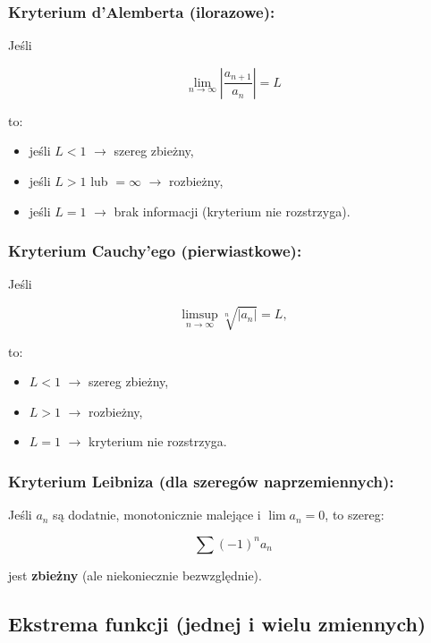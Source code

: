 \subsubsection*{Kryterium d'Alemberta (ilorazowe):}
Jeśli

$$
\lim_{n \to \infty} \left| \frac{a_{n+1}}{a_n} \right| = L
$$

to:
\begin{itemize}
    \item jeśli $L < 1$ $\rightarrow$ szereg zbieżny,
    \item jeśli $L > 1$ lub $= \infty$ $\rightarrow$ rozbieżny,
    \item jeśli $L = 1$ $\rightarrow$ brak informacji (kryterium nie rozstrzyga).
\end{itemize}

\subsubsection*{Kryterium Cauchy'ego (pierwiastkowe):}
Jeśli

$$
\limsup_{n \to \infty} \sqrt[n]{|a_n|} = L,
$$

to:
\begin{itemize}
    \item $L < 1$ $\rightarrow$ szereg zbieżny,
    \item $L > 1$ $\rightarrow$ rozbieżny,
    \item $L = 1$ $\rightarrow$ kryterium nie rozstrzyga.
\end{itemize}

\subsubsection*{Kryterium Leibniza (dla szeregów naprzemiennych):}
Jeśli $a_n$ są dodatnie, monotonicznie malejące i $\lim a_n = 0$, to szereg:

$$
\sum (-1)^n a_n
$$

jest \textbf{zbieżny} (ale niekoniecznie bezwzględnie).

\subsection{Ekstrema funkcji (jednej i wielu zmiennych)}

